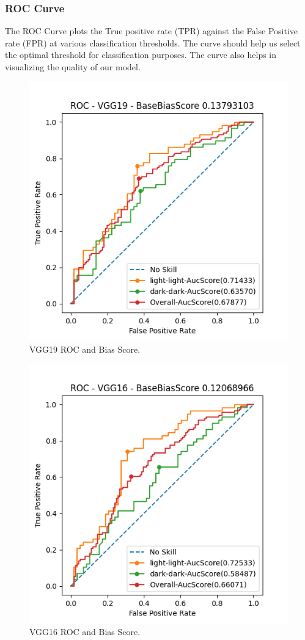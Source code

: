 \documentclass[conference]{IEEEtran}
\begin{document}
\subsubsection{ROC Curve}
The ROC Curve plots the True positive rate (TPR) against the False Positive rate (FPR) at various classification thresholds. The curve should help us select the optimal threshold for classification purposes. The curve also helps in visualizing the  quality of our model. 

\begin{figure}[htbp]
    \centerline{\includegraphics[width=0.9\linewidth]{latex/images/VGG19.png}}
    \caption{VGG19 ROC and Bias Score.}
    \label{vgg19_roc}
\end{figure}

\begin{figure}[htbp]
    \centerline{\includegraphics[width=0.9\linewidth]{latex/images/VGG16.png}}
    \caption{VGG16 ROC and Bias Score.}
    \label{vgg16_roc}
\end{figure}
\end{document}
